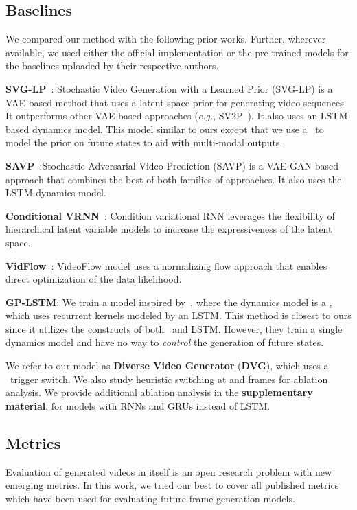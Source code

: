 \documentclass{article} \usepackage{iclr2021_conference,times}
\newcommand{\GP}{}
\def\eg{\emph{e.g.}}
\begin{document}
\vspace{-0.05in}
\subsection{Baselines}
\vspace{-0.05in}
We compared our method with the following prior works. Further, wherever available, we used either the official implementation or the pre-trained models for the baselines uploaded by their respective authors.

\noindent\textbf{SVG-LP}~\citep{denton2018stochastic}: Stochastic Video Generation with a Learned Prior (SVG-LP) is a VAE-based method that uses a latent space prior for generating video sequences. It outperforms other VAE-based approaches (\eg, SV2P~\citep{babaeizadeh2017stochastic}). It also uses an LSTM-based dynamics model. This model similar to ours except that we use a \GP\ to model the prior on future states to aid with multi-modal outputs.

\noindent\textbf{SAVP}~\citep{lee2018savp}:Stochastic Adversarial Video Prediction (SAVP) is a VAE-GAN based approach that combines the best of both families of approaches. It also uses the LSTM dynamics model.

\noindent\textbf{Conditional VRNN}~\citep{Castrejon:2019}: Condition variational RNN leverages the flexibility of hierarchical latent variable models to increase the expressiveness of the latent space.

\noindent\textbf{VidFlow}~\citep{kumar2019videoflow}: VideoFlow model uses a normalizing flow approach that enables  direct optimization of the data likelihood.

\noindent\textbf{GP-LSTM}: We train a model inspired by~\citep{alshedivat2016learning}, where the dynamics model is a \GP , which uses recurrent kernels modeled by an LSTM. This method is closest to ours since it utilizes the constructs of both \GP\ and LSTM. However, they train a single dynamics model and have no way to \emph{control} the generation of future states. 


We refer to our model as \textbf{Diverse Video Generator} (\textbf{DVG}), which uses a \GP\ trigger switch. We also study heuristic switching at  and  frames for ablation analysis. We provide additional ablation analysis in the \textbf{supplementary material}, for models with RNNs and GRUs instead of LSTM.


\vspace{-0.05in}
\subsection{Metrics}
\vspace{-0.05in}
Evaluation of generated videos in itself is an open research problem with new emerging metrics. In this work, we tried our best to cover all published metrics which have been used for evaluating future frame generation models.
\end{document}
